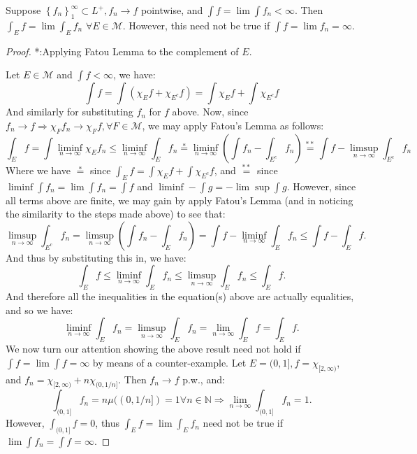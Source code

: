 \begin{problem}
Suppose $\left\{f_n\right\}_1^{\infty} \subset L^{+}, f_n \rightarrow f$ pointwise, and $\int f=\lim \int f_n<\infty$.
Then $\int_E f=\lim \int_E f_n$ $\forall E \in \mathcal{M}$.
However, this need not be true if $\int f=\lim f_n=\infty$.
\end{problem}

\begin{proof}
    *:Applying Fatou Lemma to the complement of $E$.

	Let $E \in \mathcal{M}$ and $\int f<\infty$, we have:
	$$
		\int f=\int\left(\chi_E f+\chi_{E^c} f\right)=\int \chi_E f+\int \chi_{E^c} f
	$$
	And similarly for substituting $f_n$ for $f$ above. Now, since $f_n \rightarrow f \Rightarrow \chi_F f_n \rightarrow \chi_F f, \forall F \in \mathcal{M}$, we may apply Fatou's Lemma as follows:
	$$
		\int_E f=\int \liminf _{n \rightarrow \infty} \chi_E f_n \leq \liminf _{n \rightarrow \infty} \int_E f_n \stackrel{*}{=} \liminf _{n \rightarrow \infty}\left(\int f_n-\int_{E^c} f_n\right) \stackrel{* *}{=} \int f-\limsup _{n \rightarrow \infty} \int_{E^c} f_n
	$$
	Where we have $\stackrel{*}{=}$ since $\int_E f=\int \chi_E f+\int \chi_{E^c} f$, and $\stackrel{* *}{=}$ since $\liminf \int f_n=\lim \int f_n=\int f$ and $\liminf -\int g=-\lim \sup \int g$.
	However, since all terms above are finite, we may gain by apply Fatou's Lemma (and in noticing the similarity to the steps made above) to see that:
	$$
		\limsup _{n \rightarrow \infty} \int_{E^c} f_n=\limsup _{n \rightarrow \infty}\left(\int f_n-\int_E f_n\right)=\int f-\liminf _{n \rightarrow \infty} \int_E f_n \leq \int f-\int_E f.
	$$
	And thus by substituting this in, we have:
	$$
		\int_E f \leq \liminf _{n \rightarrow \infty} \int_E f_n \leq \limsup _{n \rightarrow \infty} \int_E f_n \leq \int_E f.
	$$
	And therefore all the inequalities in the equation(s) above are actually equalities, and so we have:
	$$
		\liminf _{n \rightarrow \infty} \int_E f_n=\limsup _{n \rightarrow \infty} \int_E f_n=\lim _{n \rightarrow \infty} \int_E f=\int_E f.
	$$
	We now turn our attention showing the above result need not hold if $\int f=\lim \int f=\infty$ by means of a counter-example. Let $E=(0,1], f=\chi_{[2, \infty)}$, and $f_n=\chi_{[2, \infty)}+n \chi_{(0,1 / n]}$. Then $f_n \rightarrow f$ p.w., and:
			$$
			\int_{(0,1]} f_n=n \mu((0,1 / n])=1 \forall n \in \mathbb{N} \Rightarrow \lim _{n \rightarrow \infty} \int_{(0,1]} f_n=1.
	$$
	However, $\int_{(0,1]} f=0$, thus $\int_E f=\lim \int_E f_n$ need not be true if $\lim \int f_{n}=\int f=\infty$.
\end{proof}

